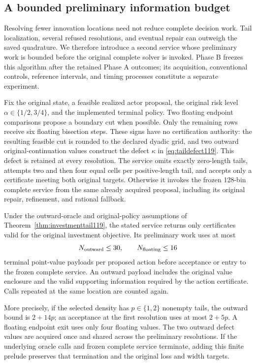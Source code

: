 \subsection{A bounded preliminary information budget}
\label{sec:budgetedtail119}
Resolving fewer innovation locations need not reduce complete decision
work.  Tail localization, several refused resolutions, and eventual repair
can outweigh the saved quadrature.  We therefore introduce a second
service whose preliminary work is bounded before the original complete
solver is invoked.  Phase B freezes this algorithm after the retained
Phase A outcomes; its acquisition, conventional controls, reference
intervals, and timing processes constitute a separate experiment.

Fix the original state, a feasible realized actor proposal, the original
risk level $\alpha\in\{1/2,3/4\}$, and the implemented terminal policy.
Two floating endpoint comparisons propose a boundary cut when possible.
Only the remaining rows receive six floating bisection steps.  These
signs have no certification authority: the resulting feasible cut is
rounded to the declared dyadic grid, and two outward original-continuation
values construct the defect $\kappa$ in
\eqref{eq:taildefect119}.  This defect is retained at every resolution.
The service omits exactly zero-length tails, attempts two and then four
equal cells per positive-length tail, and accepts only a certificate
meeting both original targets.  Otherwise it invokes the frozen
128-bin complete service from the same already acquired proposal,
including its original repair, refinement, and rational fallback.

\begin{proposition}
\label{prop:budgetedtail119}
Under the outward-oracle and original-policy assumptions of
Theorem~\ref{thm:investmenttail119}, the stated service returns only
certificates valid for the original investment objective.  Its preliminary
work uses at most
\begin{equation}\label{eq:budgetedtailcount119}
 N_{\rm outward}\le 30,
 \qquad N_{\rm floating}\le16
\end{equation}
terminal point-value payloads per proposed action before acceptance or
entry to the frozen complete service.  An outward payload includes the
original value enclosure and the valid supporting information required
by the action certificate.  Calls repeated at the same location are
counted again.

More precisely, if the selected density has $p\in\{1,2\}$ nonempty
tails, the outward bound is $2+14p$; an acceptance at the first
resolution uses at most $2+5p$.  A floating endpoint exit uses only four
floating values.  The two outward defect values are acquired once and
shared across the preliminary resolutions.  If the underlying oracle
calls and frozen complete service terminate, adding this finite prelude
preserves that termination and the original loss and width targets.
\end{proposition}

